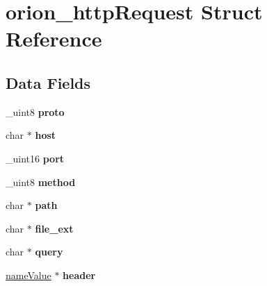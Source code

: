 \hypertarget{structorion__httpRequest}{
\section{orion\_\-httpRequest Struct Reference}
\label{structorion__httpRequest}
}
\subsection*{Data Fields}
\begin{DoxyCompactItemize}
\item 
\hypertarget{structorion__httpRequest_a64bfaa516d428c86822d7f699a4b3fbd}{
\_\-uint8 {\bfseries proto}}
\label{structorion__httpRequest_a64bfaa516d428c86822d7f699a4b3fbd}

\item 
\hypertarget{structorion__httpRequest_ab899e4a0d9502a87d55dd2fc7787967f}{
char $\ast$ {\bfseries host}}
\label{structorion__httpRequest_ab899e4a0d9502a87d55dd2fc7787967f}

\item 
\hypertarget{structorion__httpRequest_aacfa6b224771298d4f9aa307e75cdae9}{
\_\-uint16 {\bfseries port}}
\label{structorion__httpRequest_aacfa6b224771298d4f9aa307e75cdae9}

\item 
\hypertarget{structorion__httpRequest_a691ee7358c2c7044f6afc00f839537a0}{
\_\-uint8 {\bfseries method}}
\label{structorion__httpRequest_a691ee7358c2c7044f6afc00f839537a0}

\item 
\hypertarget{structorion__httpRequest_ae7e83c1e229725ede948c04bd6716644}{
char $\ast$ {\bfseries path}}
\label{structorion__httpRequest_ae7e83c1e229725ede948c04bd6716644}

\item 
\hypertarget{structorion__httpRequest_a4cf693d1981aa9bda14320010e7c5e60}{
char $\ast$ {\bfseries file\_\-ext}}
\label{structorion__httpRequest_a4cf693d1981aa9bda14320010e7c5e60}

\item 
\hypertarget{structorion__httpRequest_a3282df4577d8ff490b6c98e2f5e09c08}{
char $\ast$ {\bfseries query}}
\label{structorion__httpRequest_a3282df4577d8ff490b6c98e2f5e09c08}

\item 
\hypertarget{structorion__httpRequest_a2bb44c21fd7f0c7e6f3cd181e80da379}{
\hyperlink{structnameValue}{nameValue} $\ast$ {\bfseries header}}
\label{structorion__httpRequest_a2bb44c21fd7f0c7e6f3cd181e80da379}


\end{DoxyCompactItemize}
